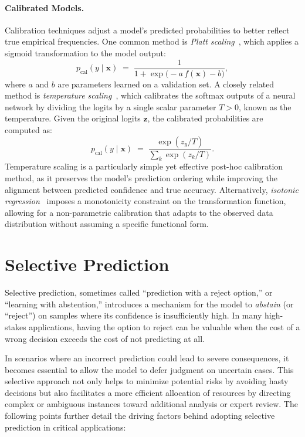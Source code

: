 \paragraph{Calibrated Models.}
Calibration techniques adjust a model’s predicted probabilities to better reflect true empirical frequencies. One common method is \emph{Platt scaling}~\citep{platt1999probabilistic}, which applies a sigmoid transformation to the model output:
\begin{equation}
p_{\text{cal}}(y \mid \bm{x}) \;=\; \frac{1}{1 + \exp\bigl(-a \, f(\bm{x}) - b\bigr)},
\end{equation}
where $a$ and $b$ are parameters learned on a validation set. A closely related method is \emph{temperature scaling}~\citep{guo2017calibration}, which calibrates the softmax outputs of a neural network by dividing the logits by a single scalar parameter $T > 0$, known as the temperature. Given the original logits $\bm{z}$, the calibrated probabilities are computed as:
\begin{equation}
p_{\text{cal}}(y \mid \bm{x}) \;=\; \frac{\exp(z_y / T)}{\sum_{k} \exp(z_k / T)}.
\end{equation}
Temperature scaling is a particularly simple yet effective post-hoc calibration method, as it preserves the model’s prediction ordering while improving the alignment between predicted confidence and true accuracy. Alternatively, \emph{isotonic regression}~\citep{zadrozny2002transforming} imposes a monotonicity constraint on the transformation function, allowing for a non-parametric calibration that adapts to the observed data distribution without assuming a specific functional form.




\section{Selective Prediction}
Selective prediction, sometimes called ``prediction with a reject option,'' or ``learning with abstention,'' introduces a mechanism for the model to \emph{abstain} (or ``reject'') on samples where its confidence is insufficiently high. In many high-stakes applications, having the option to reject can be valuable when the cost of a wrong decision exceeds the cost of not predicting at all.

In scenarios where an incorrect prediction could lead to severe consequences, it becomes essential to allow the model to defer judgment on uncertain cases. This selective approach not only helps to minimize potential risks by avoiding hasty decisions but also facilitates a more efficient allocation of resources by directing complex or ambiguous instances toward additional analysis or expert review. The following points further detail the driving factors behind adopting selective prediction in critical applications:

